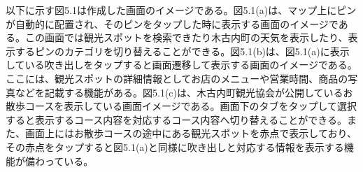 以下に示す図5.1は作成した画面のイメージである。図5.1(a)は、マップ上にピンが自動的に配置され、そのピンをタップした時に表示する画面のイメージである。この画面では観光スポットを検索できたり木古内町の天気を表示したり、表示するピンのカテゴリを切り替えることができる。図5.1(b)は、図5.1(a)に表示している吹き出しをタップすると画面遷移して表示する画面のイメージである。ここには、観光スポットの詳細情報としてお店のメニューや営業時間、商品の写真などを記載する機能がある。図5.1(c)は、木古内町観光協会が公開しているお散歩コースを表示している画面イメージである。画面下のタブをタップして選択すると表示するコース内容を対応するコース内容へ切り替えることができる。また、画面上にはお散歩コースの途中にある観光スポットを赤点で表示しており、その赤点をタップすると図5.1(a)と同様に吹き出しと対応する情報を表示する機能が備わっている。


